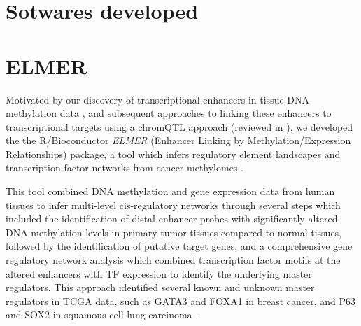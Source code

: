 
\section{Sotwares developed}

\section{ELMER}

Motivated by our discovery of transcriptional enhancers in tissue DNA methylation data \cite{berman2012ng}, and subsequent approaches to linking these enhancers to transcriptional targets using a chromQTL approach \cite{aran2013dna} (reviewed in \cite{yao2015review}), we developed the the R/Bioconductor  \textit{ELMER} (Enhancer Linking by Methylation/Expression Relationships) package, a tool which infers regulatory element landscapes and transcription factor networks from cancer methylomes \cite{yao2015inferring}. 

This tool combined DNA methylation and gene expression data from human tissues to infer multi-level cis-regulatory networks through several steps which included the identification of distal enhancer probes with significantly altered DNA methylation levels in primary tumor tissues compared to normal tissues, followed by the identification of putative target genes, and a comprehensive gene regulatory network analysis which combined transcription factor motifs at the altered enhancers with TF expression to identify the underlying master regulators. This approach identified several known and unknown master regulators in TCGA data, such as GATA3 and FOXA1 in breast cancer, and P63 and SOX2 in squamous cell lung carcinoma \cite{yao2015inferring,silva2016tcga}.

